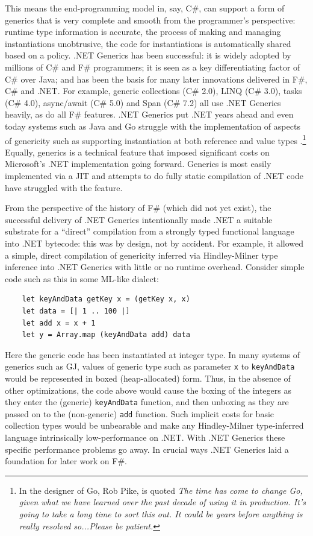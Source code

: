 \documentclass[acmsmall,screen]{acmart}
\begin{document}
This means the end-programming model in, say, C\#, can support a form of generics that is very complete and smooth from the programmer’s perspective:
runtime type information is accurate, the process of making and managing instantiations unobtrusive, the code for instantiations is automatically shared based on a
policy. .NET Generics has been successful: it is widely adopted by millions of C\# and F\# programmers; it is seen as a key differentiating factor of C\# over Java; and
has been the basis for many later innovations delivered in F\#, C\# and .NET. For example, generic collections (C\# 2.0), LINQ (C\# 3.0), tasks (C\# 4.0),
async/await (C\# 5.0) and Span (C\# 7.2) all use .NET Generics heavily, as do all F\# features. .NET Generics put .NET years ahead and even today systems such as
Java and Go struggle with the implementation of aspects of genericity such as supporting instantiation at both reference and value
types \citep{RefValhalla, RefGoGenerics}.\footnote{In \citet{RefGoGenerics2} the designer of Go, Rob Pike, is quoted \textit{The time has come to change Go, given what we have learned
over the past decade of using it in production. It’s going to take a long time to sort this out. It could be
years before anything is really resolved so...Please be patient.}}
Equally, generics is a technical feature that imposed significant costs on Microsoft’s .NET implementation going forward. Generics is most easily implemented via a JIT and attempts to do fully
static compilation of .NET code have struggled with the feature.


From the perspective of the history of F\# (which did not yet exist), the successful delivery of .NET Generics intentionally made .NET a suitable substrate
for a “direct” compilation from a strongly typed functional language into .NET bytecode: this was by design, not by accident. For example, it allowed a simple, direct
compilation of genericity inferred via Hindley-Milner type inference into .NET Generics with little or no runtime overhead.  Consider simple code such as this in some ML-like dialect:
\begin{verbatim}
    let keyAndData getKey x = (getKey x, x)
    let data = [| 1 .. 100 |]
    let add x = x + 1
    let y = Array.map (keyAndData add) data
\end{verbatim}

Here the generic code has been instantiated at integer type. In many systems of generics such as GJ, values of generic type such as
parameter \texttt{x} to \texttt{keyAndData} would be represented in boxed (heap-allocated) form.  Thus, in the absence of other optimizations, the code
above would cause the boxing of the integers as they enter the (generic) \texttt{keyAndData} function, and then unboxing as they are passed on
to the (non-generic) \texttt{add} function.  Such implicit costs for basic collection types would be unbearable and make any Hindley-Milner type-inferred language
intrinsically low-performance on .NET. With .NET Generics these specific performance problems go away.  In crucial ways .NET Generics laid a foundation for later work on F\#.
\end{document}
